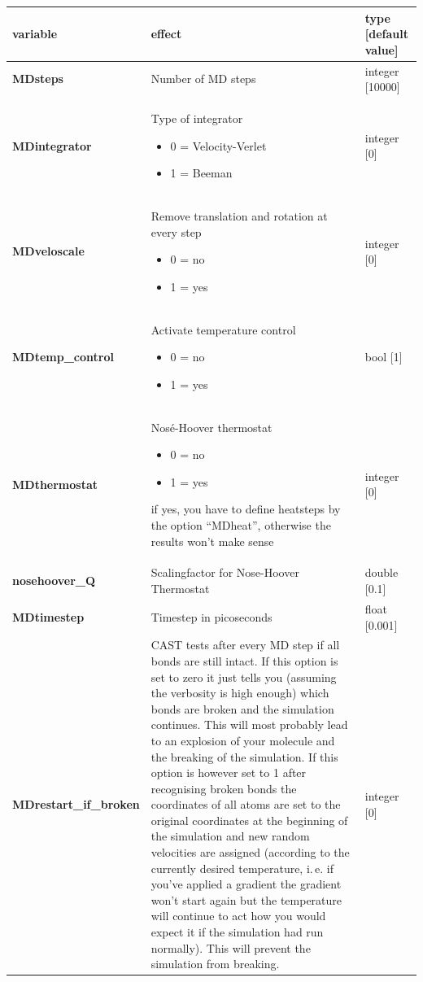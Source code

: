 \documentclass[10pt,a4paper]{article} %
\begin{document}
	\begin{longtable}{|p{4cm}|p{4.5cm}|p{3cm}|}
		variable & effect & type [default value] \\
		\hline
		\textbf{MDsteps} & Number of MD steps & integer [10000] \\
		\textbf{MDintegrator} & Type of integrator \begin{itemize}
			\item 0  = Velocity-Verlet \item 1 = Beeman
			\end{itemize} 	
		& integer [0] \\
		\textbf{MDveloscale} & Remove translation and rotation at every step\begin{itemize} \item 0 = no \item 1 = yes\end{itemize}& integer [0] \\
		\textbf{MDtemp\_control} & Activate temperature control\begin{itemize} \item 0 = no \item 1 = yes\end{itemize}& bool [1] \\
		\textbf{MDthermostat} & Nosé-Hoover thermostat\begin{itemize} \item 0 = no \item 1 = yes\end{itemize} if yes, you have to define heatsteps by the option ``MDheat'', otherwise the results won't make sense & integer [0] \\
		\textbf{nosehoover\_Q} & Scalingfactor for Nose-Hoover Thermostat & double [0.1] \\
		\textbf{MDtimestep} & Timestep in picoseconds & float [0.001] \\
		\textbf{MDrestart\_if\_broken} & CAST tests after every MD step if all bonds are still intact. If this option is set to zero it just tells you (assuming the verbosity is high enough) which bonds are broken and the simulation continues. This will most probably lead to an explosion of your molecule and the breaking of the simulation. If this option is however set to 1 after recognising broken bonds the coordinates of all atoms are set to the original coordinates at the beginning of the simulation and new random velocities are assigned (according to the currently desired temperature, i.\,e. if you've applied a gradient the gradient won't start again but the temperature will continue to act how you would expect it if the simulation had run normally). This will prevent the simulation from breaking. & integer [0] \\

\end{longtable}
\end{document}
